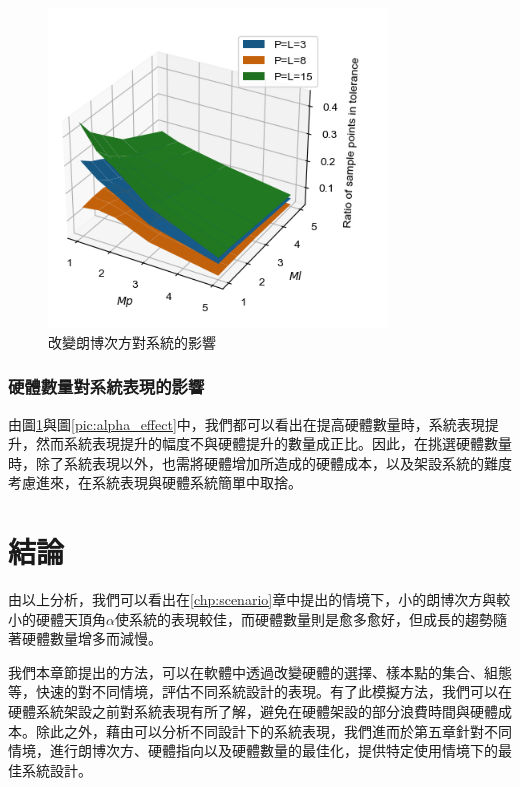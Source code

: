 \begin{figure}[h!]
    \centering
    \includegraphics[width=9cm]{ch4pic/m_effect.png}
    \caption{改變朗博次方對系統的影響}
    \label{pic:m_effect}
\end{figure}

\subsubsection{硬體數量對系統表現的影響}
\label{chp:amount_effect}

由圖\ref{pic:m_effect}與圖\ref{pic:alpha_effect}中，我們都可以看出在提高硬體數量時，系統表現提升，然而系統表現提升的幅度不與硬體提升的數量成正比。因此，在挑選硬體數量時，除了系統表現以外，也需將硬體增加所造成的硬體成本，以及架設系統的難度考慮進來，在系統表現與硬體系統簡單中取捨。




\section{結論}
\label{chp:4_conclusion}
由以上分析，我們可以看出在\ref{chp:scenario}章中提出的情境下，小的朗博次方與較小的硬體天頂角$\alpha$使系統的表現較佳，而硬體數量則是愈多愈好，但成長的趨勢隨著硬體數量增多而減慢。

我們本章節提出的方法，可以在軟體中透過改變硬體的選擇、樣本點的集合、組態等，快速的對不同情境，評估不同系統設計的表現。有了此模擬方法，我們可以在硬體系統架設之前對系統表現有所了解，避免在硬體架設的部分浪費時間與硬體成本。除此之外，藉由可以分析不同設計下的系統表現，我們進而於第五章針對不同情境，進行朗博次方、硬體指向以及硬體數量的最佳化，提供特定使用情境下的最佳系統設計。




































